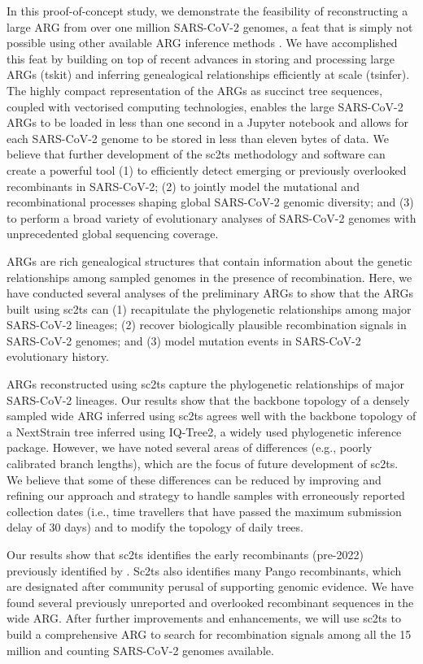 \documentclass{article}
\begin{document}
In this proof-of-concept study, we demonstrate the feasibility of reconstructing a large ARG from over one million SARS-CoV-2 genomes, a feat that is simply not possible using other available ARG inference methods \citep{Rasmussen2014-el,Ignatieva2021-rg, Speidel2019-yh}. We have accomplished this feat by building on top of recent advances in storing and processing large ARGs (tskit) and inferring genealogical relationships efficiently at scale (tsinfer). The highly compact representation of the ARGs as succinct tree sequences, coupled with vectorised computing technologies, enables the large SARS-CoV-2 ARGs to be loaded in less than one second in a Jupyter notebook and allows for each SARS-CoV-2 genome to be stored in less than eleven bytes of data. We believe that further development of the sc2ts methodology and software can create a powerful tool (1) to efficiently detect emerging or previously overlooked recombinants in SARS-CoV-2; (2) to jointly model the mutational and recombinational processes shaping global SARS-CoV-2 genomic diversity; and (3) to perform a broad variety of evolutionary analyses of SARS-CoV-2 genomes with unprecedented global sequencing coverage.

ARGs are rich genealogical structures that contain information about the genetic relationships among sampled genomes in the presence of recombination. Here, we have conducted several analyses of the preliminary ARGs to show that the ARGs built using sc2ts can (1) recapitulate the phylogenetic relationships among major SARS-CoV-2 lineages; (2) recover biologically plausible recombination signals in SARS-CoV-2 genomes; and (3) model mutation events in SARS-CoV-2 evolutionary history.

ARGs reconstructed using sc2ts capture the phylogenetic relationships of major SARS-CoV-2 lineages. Our results show that the backbone topology of a densely sampled wide ARG inferred using sc2ts agrees well with the backbone topology of a NextStrain tree inferred using IQ-Tree2, a widely used phylogenetic inference package. However, we have noted several areas of differences (e.g., poorly calibrated branch lengths), which are the focus of future development of sc2ts. We believe that some of these differences can be reduced by improving and refining our approach and strategy to handle samples with erroneously reported collection dates (i.e., time travellers that have passed the maximum submission delay of 30 days) and to modify the topology of daily trees.

Our results show that sc2ts identifies the early recombinants (pre-2022) previously identified by \cite{Jackson2021-ik}. Sc2ts also identifies many Pango recombinants, which are designated after community perusal of supporting genomic evidence. We have found several previously unreported and overlooked recombinant sequences in the wide ARG. After further improvements and enhancements, we will use sc2ts to build a comprehensive ARG to search for recombination signals among all the 15 million and counting SARS-CoV-2 genomes available.
\end{document}
